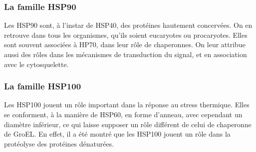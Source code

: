 \subsubsection{La famille HSP90} %
\label{ssub:la_famille_hsp90}


  Les HSP90 sont, à l'instar de HSP40, des protéines hautement concervées. On
  en retrouve dans tous les organismes, qu’ils soient eucaryotes ou
  procaryotes. Elles sont souvent associées à HP70, dans leur rôle de
  chaperonnes. On leur attribue aussi des rôles dans les mécanismes de
  transduction du signal, et en association avec le cytosquelette.

\subsubsection{La famille HSP100} %
\label{ssub:la_famille_hsp100}

Les HSP100 jouent un rôle important dans la réponse au stress thermique. %
Elles se conforment, à la manière de HSP60, en forme d'anneau, avec cependant un diamètre inférieur, ce qui laisse supposer un rôle différent de celui de chaperonne de GroEL.
En effet, il a été montré que les HSP100 jouent un rôle dans la protéolyse des protéines dénaturées.

%

